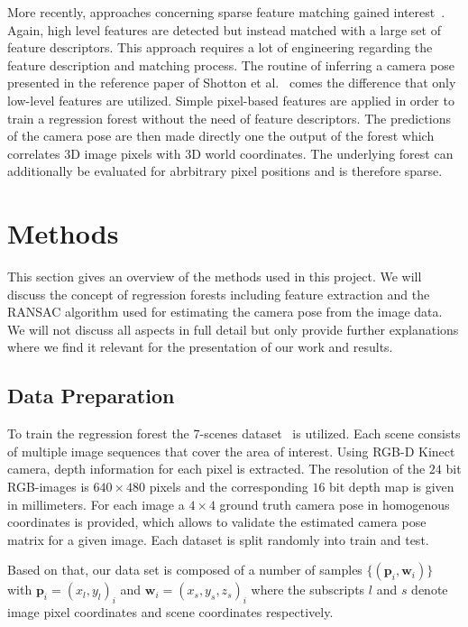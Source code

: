 \documentclass[final]{cvpr}
\begin{document}
More recently, approaches concerning sparse feature matching gained interest~\cite{Holzer2012}. Again, high level features are detected but 
instead matched with a large set of feature descriptors. This approach requires a lot of engineering regarding the feature
description and matching process. The routine of inferring a camera pose presented in the reference paper of Shotton et al.~\cite{shotton2013}
comes the difference that only low-level features are utilized. Simple pixel-based features are applied in order to train a
regression forest without the need of feature descriptors. The predictions of the camera pose are then made directly one the
output of the forest which correlates 3D image pixels with 3D world coordinates. The underlying forest can additionally be 
evaluated for abrbitrary pixel positions and is therefore sparse.


\section{Methods}
This section gives an overview of the methods used in this project. We will discuss
the concept of regression forests including feature extraction and the RANSAC algorithm
used for estimating the camera pose from the image data. We will not discuss all aspects
in full detail but only provide further explanations where we find it relevant
for the presentation of our work and results.

\subsection{Data Preparation}
To train the regression forest the 7-scenes dataset~\cite{glocker2013} is utilized. 
Each scene consists of multiple image sequences that cover the area of interest. Using RGB-D 
Kinect camera, depth information for each pixel is extracted. The resolution of the $24$ 
bit RGB-images is $640\times480$ pixels and the corresponding $16$ bit depth map is given 
in millimeters. For each image a $4\times4$ ground truth camera pose in homogenous coordinates 
is provided, which allows to validate the estimated camera pose matrix for a given image. 
Each dataset is split randomly into train and test. 

Based on that, our data set is composed of a number of samples $\{(\boldsymbol{p}_i, \boldsymbol{w}_i)\}$ with
$\boldsymbol{p}_i = (x_l, y_l)_i$ and $\boldsymbol{w}_i = (x_s, y_s, z_s)_i$ where the subscripts
$l$ and $s$ denote image pixel coordinates and scene coordinates respectively.\\
\end{document}
